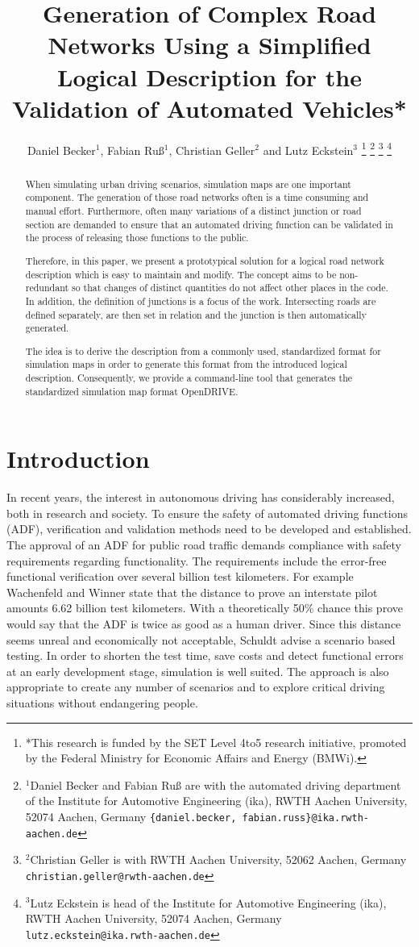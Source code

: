 \documentclass[a4paper, 10pt, conference]{ieeeconf}      %
\title{\LARGE \bf
Generation of Complex Road Networks Using a Simplified Logical Description for the Validation of Automated Vehicles*
}
\author{Daniel Becker$^{1}$, Fabian Ru{\ss}$^{1}$, Christian Geller$^2$ and Lutz Eckstein$^{3}$%
\thanks{*This research is funded by the SET Level 4to5 research initiative, promoted by the	Federal Ministry for Economic Affairs and Energy (BMWi).}%
\thanks{$^{1}$Daniel Becker and Fabian Ru{\ss} are with the automated driving department of the Institute for Automotive Engineering (ika), RWTH Aachen University, 52074 	Aachen, Germany {\tt\small \{daniel.becker, fabian.russ\}@ika.rwth-aachen.de}}%
\thanks{$^{2}$Christian Geller is with RWTH Aachen University, 52062 Aachen, Germany
	{\tt\small christian.geller@rwth-aachen.de}}%
\thanks{$^{3}$Lutz Eckstein is head of the Institute for Automotive Engineering (ika), RWTH Aachen University, 52074 Aachen, Germany {\tt\small lutz.eckstein@ika.rwth-aachen.de}}%
}
\begin{document}
\maketitle
\thispagestyle{empty}
\pagestyle{empty}

\begin{abstract} %
When simulating urban driving scenarios, simulation maps are one important component. The generation of those road networks often is a time consuming and manual effort. Furthermore, often many variations of a distinct junction or road section are demanded to ensure that an automated driving function can be validated in the process of releasing those functions to the public. 

Therefore, in this paper, we present a prototypical solution for a logical road network description which is easy to maintain and modify. The concept aims to be non-redundant so that changes of distinct quantities do not affect other places in the code. In addition, the definition of junctions is a focus of the work. Intersecting roads are defined separately, are then set in relation and the junction is then automatically generated. 

The idea is to derive the description from a commonly used, standardized format for simulation maps in order to generate this format from the introduced logical description. Consequently, we provide a command-line tool that generates the standardized simulation map format OpenDRIVE.

\end{abstract}

\section{Introduction}
In recent years, the interest in autonomous driving has considerably increased, both in research and society. To ensure the safety of automated driving functions (ADF), verification and validation methods need to be developed and established. The approval of an ADF for public road traffic demands compliance with safety requirements regarding functionality. The requirements include the error-free functional verification over several billion test kilometers. For example Wachenfeld and Winner \cite{wachenfeld2016release} state that the distance to prove an interstate pilot amounts 6.62 billion test kilometers. With a theoretically 50\% chance this prove would say that the ADF is twice as good as a human driver. Since this distance seems unreal and economically not acceptable, Schuldt \cite{schuldt2017beitrag} advise a scenario based testing. In order to shorten the test time, save costs and detect functional errors at an early development stage, simulation is well suited. The approach is also appropriate to create any number of scenarios and to explore critical driving situations without endangering people.
\end{document}
